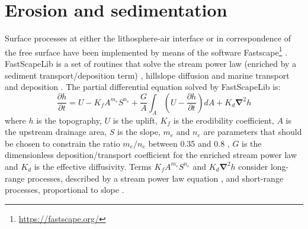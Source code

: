 \documentclass[hidelinks,10pt,a4paper]{article}
\begin{document}
\section{Erosion and sedimentation}\label{sec:erosion}
Surface processes at either the lithosphere-air interface or in correspondence of the free surface have been implemented by means of the software
Fastscape\footnote{\url{https://fastscape.org/}} \citep{Braun2013,Cordonnier2019,Yuan2019a,Yuan2019b}. FastScapeLib is a set of routines that solve the stream
power law (enriched by a sediment transport/deposition term) \citep{Yuan2019a}, hillslope diffusion and marine transport and deposition \citep{Yuan2019b}.
The partial differential equation solved by FastScapeLib is:
\begin{equation}
\frac{\partial h}{ \partial t}=U-K_f A^{m_e}S^{n_e} + \frac{G}{A}\int_A \left( U-\frac{\partial h}{\partial t} \right) dA + K_d \bm{\nabla}^2 h 
\end{equation}
where $h$ is the topography, $U$ is the uplift, $K_f$ is the erodibility coefficient, $A$ is the upstream drainage area, $S$ is the slope, $m_e$ and $n_e$ are
parameters that should be chosen to constrain the ratio $m_e/n_e$ between 0.35 and 0.8 \citep{Croissant2014,Ueda2015,Beucher2020}, $G$ is the dimensionless
deposition/transport coefficient for the enriched stream power law and $K_d$ is the effective diffusivity. Terms $K_f A^{m_e}S^{n_e}$ and $K_d \bm{\nabla}^2 h$
consider long-range processes, described by a stream power law equation \citep{Tucker1999,Ueda2015,Beucher2020}, and short-range processes,
proportional to slope \citep{Burov1997,Ueda2015,Beucher2020}.
\end{document}
